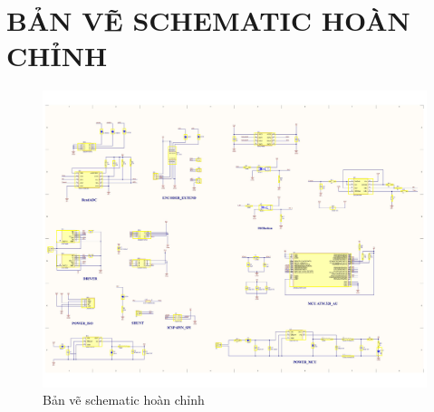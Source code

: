 \chapter{BẢN VẼ SCHEMATIC HOÀN CHỈNH}
\begin{figure}[H]
    \centering
    \includegraphics[width=1\textwidth]{pictures/ISO_current.png}
    \caption{Bản vẽ schematic hoàn chỉnh}
\end{figure}
\cleardoublepage